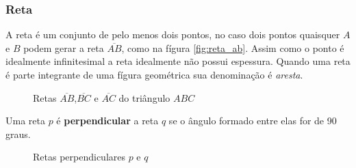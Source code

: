 \begin{multicols*}{2}

    \subsubsection{Reta}
    A reta é um conjunto de pelo menos dois pontos, no caso dois pontos quaisquer $A$ e $B$ podem gerar a reta $\overline{AB}$, como na fígura \ref{fig:reta_ab}.
    Assim como o ponto é idealmente infinitesimal a reta idealmente não possui espessura. Quando uma reta é parte
    integrante de uma fígura geométrica sua denominação é \textit{aresta}.

    \begin{figure}[H]
        \centering
        \caption{Retas $\overline{AB}$,$\overline{BC}$ e $\overline{AC}$ do triângulo $ABC$}
        \label{fig:tri_abc}
    \end{figure}


    Uma reta $p$ é \textbf{perpendicular} a reta $q$ se o ângulo formado entre elas for de 90 graus.

    \begin{figure}[H]
        \centering
        \caption{Retas perpendiculares $p$ e $q$}
    \end{figure}


\end{multicols*}
